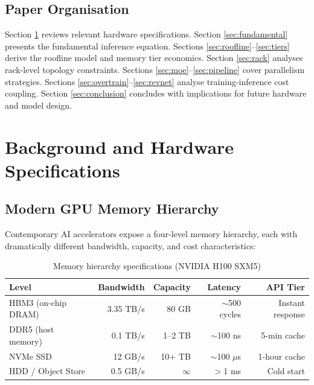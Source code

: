 \documentclass[11pt,a4paper]{article}
\begin{document}
\subsection{Paper Organisation}

Section \ref{sec:background} reviews relevant hardware specifications. Section
\ref{sec:fundamental} presents the fundamental inference equation. Sections
\ref{sec:roofline}--\ref{sec:tiers} derive the roofline model and memory tier
economics. Section \ref{sec:rack} analyses rack-level topology constraints.
Sections \ref{sec:moe}--\ref{sec:pipeline} cover parallelism strategies.
Sections \ref{sec:overtrain}--\ref{sec:revnet} analyse training-inference
cost coupling. Section \ref{sec:conclusion} concludes with implications for
future hardware and model design.

\section{Background and Hardware Specifications}
\label{sec:background}

\subsection{Modern GPU Memory Hierarchy}

Contemporary AI accelerators expose a four-level memory hierarchy, each with
dramatically different bandwidth, capacity, and cost characteristics:

\begin{table}[h]
\centering
\caption{Memory hierarchy specifications (NVIDIA H100 SXM5)}
\label{tab:memory-hierarchy}
\begin{tabular}{lrrrr}
\toprule
\textbf{Level} & \textbf{Bandwidth} & \textbf{Capacity} & \textbf{Latency} & \textbf{API Tier} \\
\midrule
HBM3 (on-chip DRAM) & 3.35 TB/s & 80 GB  & $\sim$500 cycles  & Instant response \\
DDR5 (host memory)  & 0.1 TB/s  & 1--2 TB & $\sim$100 ns     & 5-min cache \\
NVMe SSD            & 12 GB/s   & 10+ TB  & $\sim$100 $\mu$s & 1-hour cache \\
HDD / Object Store  & 0.5 GB/s  & $\infty$& $>$1 ms          & Cold start \\
\bottomrule
\end{tabular}
\end{table}
\end{document}
